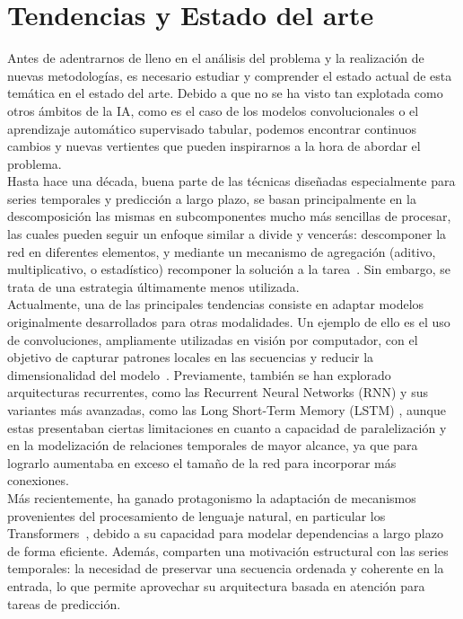 \chapter{Tendencias y Estado del arte}
\label{sota}

Antes de adentrarnos de lleno en el análisis del problema y la realización de nuevas metodologías, es necesario estudiar y comprender el estado actual de esta temática en el estado del arte. Debido a que no se ha visto tan explotada como otros ámbitos de la IA, como es el caso de los modelos convolucionales o el aprendizaje automático supervisado tabular, podemos encontrar continuos cambios y nuevas vertientes que pueden inspirarnos a la hora de abordar el problema.\\

Hasta hace una década, buena parte de las técnicas diseñadas especialmente para series temporales y predicción a largo plazo, se basan principalmente en la descomposición las mismas en subcomponentes mucho más sencillas de procesar, las cuales pueden seguir un enfoque similar a divide y vencerás: descomponer la red en diferentes elementos, y mediante un mecanismo de agregación (aditivo, multiplicativo, o estadístico) recomponer la solución a la tarea~\cite{garg2022machinelearningalgorithmstime}. Sin embargo, se trata de una estrategia últimamente menos utilizada. \\

Actualmente, una de las principales tendencias consiste en adaptar modelos originalmente desarrollados para otras modalidades. Un ejemplo de ello es el uso de convoluciones, ampliamente utilizadas en visión por computador, con el objetivo de capturar patrones locales en las secuencias y reducir la dimensionalidad del modelo~\cite{zeng2023financialtimeseriesforecasting}. Previamente, también se han explorado arquitecturas recurrentes, como las Recurrent Neural Networks (RNN) y sus variantes más avanzadas, como las Long Short-Term Memory (LSTM) \cite{6795963}, aunque estas presentaban ciertas limitaciones en cuanto a capacidad de paralelización y en la modelización de relaciones temporales de mayor alcance, ya que para lograrlo aumentaba en exceso el tamaño de la red para incorporar más conexiones.\\

Más recientemente, ha ganado protagonismo la adaptación de mecanismos provenientes del procesamiento de lenguaje natural, en particular los Transformers~\cite{wen2023transformerstimeseriessurvey}, debido a su capacidad para modelar dependencias a largo plazo de forma eficiente. Además, comparten una motivación estructural con las series temporales: la necesidad de preservar una secuencia ordenada y coherente en la entrada, lo que permite aprovechar su arquitectura basada en atención para tareas de predicción.\\

